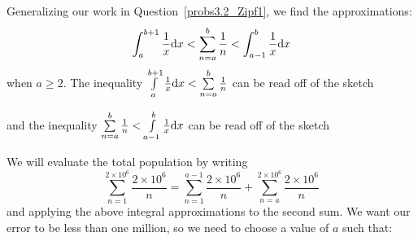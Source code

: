 \begin{solution}
	Generalizing our work in Question~\ref{probs3.2_Zipf1}, we find the approximations:
	\[\int_a^{b+1}\frac{1}{x}\mathrm{d}x<\sum_{n=a}^b \frac{1}{n} < \int_{a-1}^{b}\frac{1}{x}\mathrm{d}x\]
	when $a \ge 2$. The inequality $\int\limits_a^{b+1}\frac{1}{x}\mathrm{d}x<\sum\limits_{n=a}^b \frac{1}{n}$
can be read off of the sketch
\begin{center}
\end{center}
and the inequality $\sum\limits_{n=a}^b \frac{1}{n}<\int\limits_{a-1}^{b}\frac{1}{x}\mathrm{d}x$ can be read off of the sketch
\begin{center}
\end{center}

We will evaluate the total population by writing
\begin{equation*}
\sum_{n=1}^{2 \times 10^6}\frac{2\times 10^6}{n}
=\sum_{n=1}^{a-1}\frac{2\times 10^6}{n}
+\sum_{n=a}^{2 \times 10^6}\frac{2\times 10^6}{n}
\end{equation*}
and applying the above integral approximations to the second sum.
We want our error to be less than one million, so we need to choose a value of $a$ such that:


\end{solution}
